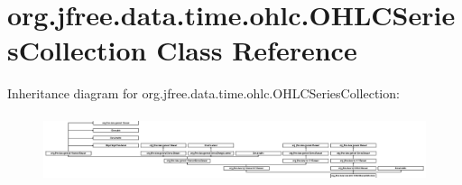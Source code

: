 \hypertarget{classorg_1_1jfree_1_1data_1_1time_1_1ohlc_1_1_o_h_l_c_series_collection}{}\section{org.\+jfree.\+data.\+time.\+ohlc.\+O\+H\+L\+C\+Series\+Collection Class Reference}
\label{classorg_1_1jfree_1_1data_1_1time_1_1ohlc_1_1_o_h_l_c_series_collection}
Inheritance diagram for org.\+jfree.\+data.\+time.\+ohlc.\+O\+H\+L\+C\+Series\+Collection\+:\begin{figure}[H]
\begin{center}
\leavevmode
\includegraphics[height=1.985816cm]{classorg_1_1jfree_1_1data_1_1time_1_1ohlc_1_1_o_h_l_c_series_collection}
\end{center}
\end{figure}

